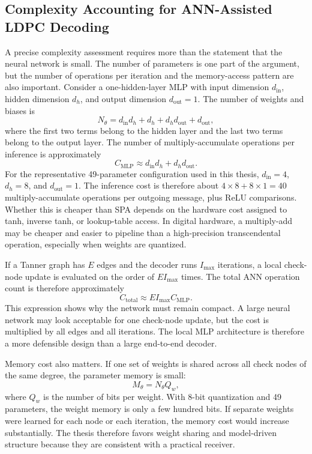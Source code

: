 \subsection{Complexity Accounting for ANN-Assisted LDPC Decoding}
A precise complexity assessment requires more than the statement that the neural network is small. The number of parameters is one part of the argument, but the number of operations per iteration and the memory-access pattern are also important. Consider a one-hidden-layer MLP with input dimension $d_{\mathrm{in}}$, hidden dimension $d_h$, and output dimension $d_{\mathrm{out}}=1$. The number of weights and biases is
\begin{equation}
  N_\theta=d_{\mathrm{in}}d_h+d_h+d_h d_{\mathrm{out}}+d_{\mathrm{out}},
\end{equation}
where the first two terms belong to the hidden layer and the last two terms belong to the output layer. The number of multiply-accumulate operations per inference is approximately
\begin{equation}
  C_{\mathrm{MLP}}\approx d_{\mathrm{in}}d_h+d_h d_{\mathrm{out}}.
\end{equation}
For the representative 49-parameter configuration used in this thesis, $d_{\mathrm{in}}=4$, $d_h=8$, and $d_{\mathrm{out}}=1$. The inference cost is therefore about $4\times 8+8\times 1=40$ multiply-accumulate operations per outgoing message, plus ReLU comparisons. Whether this is cheaper than SPA depends on the hardware cost assigned to tanh, inverse tanh, or lookup-table access. In digital hardware, a multiply-add may be cheaper and easier to pipeline than a high-precision transcendental operation, especially when weights are quantized.

If a Tanner graph has $E$ edges and the decoder runs $I_{\max}$ iterations, a local check-node update is evaluated on the order of $E I_{\max}$ times. The total ANN operation count is therefore approximately
\begin{equation}
  C_{\mathrm{total}}\approx E I_{\max} C_{\mathrm{MLP}}.
\end{equation}
This expression shows why the network must remain compact. A large neural network may look acceptable for one check-node update, but the cost is multiplied by all edges and all iterations. The local MLP architecture is therefore a more defensible design than a large end-to-end decoder.

Memory cost also matters. If one set of weights is shared across all check nodes of the same degree, the parameter memory is small:
\begin{equation}
  M_{\theta}=N_{\theta}Q_w,
\end{equation}
where $Q_w$ is the number of bits per weight. With 8-bit quantization and 49 parameters, the weight memory is only a few hundred bits. If separate weights were learned for each node or each iteration, the memory cost would increase substantially. The thesis therefore favors weight sharing and model-driven structure because they are consistent with a practical receiver.

